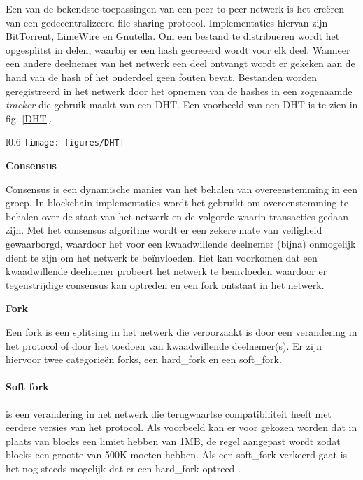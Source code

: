 Een van de bekendste toepassingen van een peer-to-peer netwerk is het creëren van een gedecentralizeerd file-sharing protocol. Implementaties hiervan zijn BitTorrent, LimeWire en Gnutella. Om een bestand te distribueren wordt het opgesplitst in delen, waarbij er een hash gecreëerd wordt voor elk deel. Wanneer een andere deelnemer van het netwerk een deel ontvangt wordt er gekeken aan de hand van de hash of het onderdeel geen fouten bevat. Bestanden worden geregistreerd in het netwerk door het opnemen van de hashes in een zogenaamde \textit{tracker} die gebruik maakt van een \acrfull{DHT}. Een voorbeeld van een DHT is te zien in fig. \ref{DHT}.

\newpage
\begin{wrapfigure}{l}{0.6\textwidth}
  \texttt{[image: figures/DHT]}
  \caption[Distributed Hash Table] {
    Door het vertalen van data naar een cryptografische sleutel is het mogelijk om aan de hand van de sleutel de data op te vragen aan peers die de data bezitten.
  }
  \label{DHT}
\end{wrapfigure}

\textbf{Consensus}

Consensus is een dynamische manier van het behalen van overeenstemming in een groep. In blockchain implementaties wordt het gebruikt om overeenstemming te behalen over de staat van het netwerk en de volgorde waarin transacties gedaan zijn. Met het consensus algoritme wordt er een zekere mate van veiligheid gewaarborgd, waardoor het voor een kwaadwillende deelnemer (bijna) onmogelijk dient te zijn om het netwerk te beïnvloeden. Het kan voorkomen dat een kwaadwillende deelnemer probeert het netwerk te beïnvloeden waardoor er tegenstrijdige consensus kan optreden en een \gls{fork} ontstaat in het netwerk.

\textbf{Fork}

Een \gls{fork} is een splitsing in het netwerk die veroorzaakt is door een verandering in het protocol of door het toedoen van kwaadwillende deelnemer(s). Er zijn hiervoor twee categorieën \glspl{fork}, een \gls{hard_fork} en een \gls{soft_fork}.

\paragraph{Soft fork}

is een verandering in het netwerk die terugwaartse compatibiliteit heeft met eerdere versies van het protocol. Als voorbeeld kan er voor gekozen worden dat in plaats van blocks een limiet hebben van 1MB, de regel aangepast wordt zodat blocks een grootte van 500K moeten hebben. Als een \gls{soft_fork} verkeerd gaat is het nog steeds mogelijk dat er een \gls{hard_fork} optreed \citep[Soft Fork]{coindesk:forks}.

